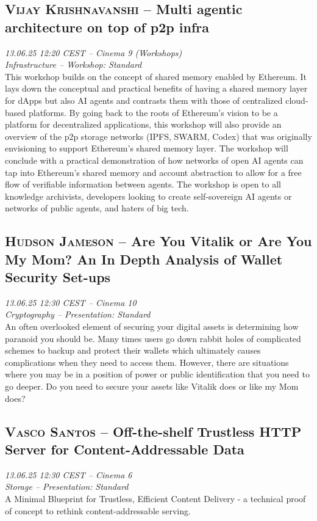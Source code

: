 \subsection {\textsc{Vijay Krishnavanshi}  -- Multi agentic architecture on top of p2p infra} \noindent \textit {13.06.25 12:20 CEST -- Cinema 9 (Workshops)\\ Infrastructure -- Workshop: Standard}\\[1em] This workshop builds on the concept of shared memory enabled by Ethereum. It lays down the conceptual and practical benefits of having a shared memory layer for dApps but also AI agents and contrasts them with those of centralized cloud-based platforms. By going back to the roots of Ethereum's vision to be a platform for decentralized applications, this workshop will also provide an overview of the p2p storage networks (IPFS, SWARM, Codex) that was originally envisioning to support Ethereum's shared memory layer. The workshop will conclude with a practical demonstration of how networks of open AI agents can tap into Ethereum's shared memory and account abstraction to allow for a free flow of verifiable information between agents. 
The workshop is open to all knowledge archivists, developers looking to create self-sovereign AI agents or networks of public agents, and haters of big tech.

\clearpage
\subsection {\textsc{Hudson Jameson}  -- Are You Vitalik or Are You My Mom? An In Depth Analysis of Wallet Security Set-ups} \noindent \textit {13.06.25 12:30 CEST -- Cinema 10\\ Cryptography -- Presentation: Standard}\\[1em] An often overlooked element of securing your digital assets is determining how paranoid you should be. Many times users go down rabbit holes of complicated schemes to backup and protect their wallets which ultimately causes complications when they need to access them. However, there are situations where you may be in a position of power or public identification that you need to go deeper. Do you need to secure your assets like Vitalik does or like my Mom does?

\clearpage
\subsection {\textsc{Vasco Santos}  -- Off-the-shelf Trustless HTTP Server for Content-Addressable Data} \noindent \textit {13.06.25 12:30 CEST -- Cinema 6\\ Storage -- Presentation: Standard}\\[1em] A Minimal Blueprint for Trustless, Efficient Content Delivery - a technical proof of concept to rethink content-addressable serving.

